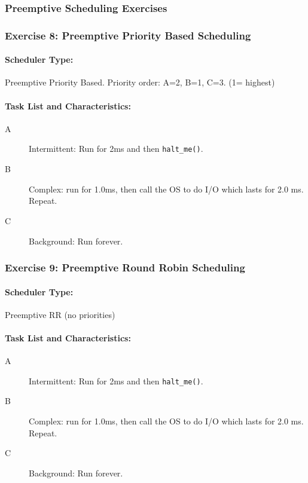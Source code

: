 
\subsubsection*{Preemptive Scheduling Exercises}

\subsubsection{Exercise 8: Preemptive Priority Based Scheduling}

\paragraph{Scheduler Type:} Preemptive Priority Based. Priority order: A=2, B=1, C=3. (1= highest)
\paragraph{Task List and Characteristics:}  
            \begin{description} 
    \item [A] Intermittent: Run for 2ms and then {\tt halt\_me()}.
    \item [B] Complex:  run for 1.0ms, then call the OS to do I/O which
      lasts for 2.0 ms.  Repeat.
    \item [C] Background: Run forever.
\end{description}


\subsubsection{Exercise 9: Preemptive Round Robin Scheduling}

\paragraph{Scheduler Type:} Preemptive RR (no priorities)
\paragraph{Task List and Characteristics:}  
            \begin{description} 
    \item [A] Intermittent: Run for 2ms and then {\tt halt\_me()}.
    \item [B] Complex:  run for 1.0ms, then call the OS to do I/O which
      lasts for 2.0 ms.  Repeat.
    \item [C] Background: Run forever.
\end{description}
  


